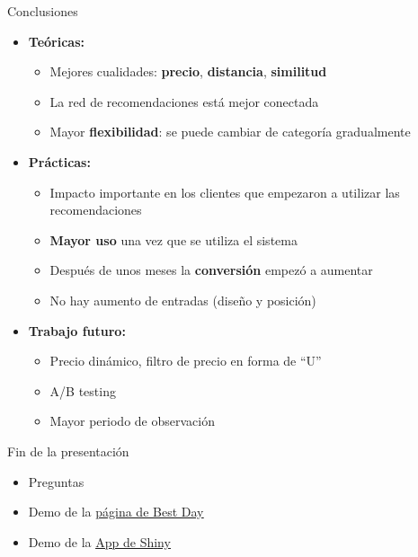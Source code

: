 \documentclass{beamer}
\begin{document}
\begin{frame}{Conclusiones}
	\begin{itemize}
		\item \textbf{Teóricas:}
		\begin{itemize}
			\item Mejores cualidades: \textbf{precio}, \textbf{distancia}, \textbf{similitud}
			\item La red de recomendaciones está mejor conectada
			\item Mayor \textbf{flexibilidad}: se puede cambiar de categoría gradualmente
		\end{itemize}
		\item \textbf{Prácticas:}
		\begin{itemize}
			\item Impacto importante en los clientes que empezaron a utilizar las recomendaciones
			\item \textbf{Mayor uso} una vez que se utiliza el sistema
			\item Después de unos meses la \textbf{conversión} empezó a aumentar
			\item No hay aumento de entradas (diseño y posición)
		\end{itemize}
		\item \textbf{Trabajo futuro:}
		\begin{itemize}
			\item Precio dinámico, filtro de precio en forma de ``U''
			\item A/B testing
			\item Mayor periodo de observación
		\end{itemize}
	\end{itemize}
\end{frame}

\begin{frame}{Fin de la presentación}
\huge
	\begin{itemize}
		\item Preguntas
		\item Demo de la \href{http://www.bestday.com}{\underline{página de Best Day}}
		\item Demo de la \href{https://felipegerard.shinyapps.io/ShinyApp/}{\underline{App de Shiny}}
	\end{itemize}
\end{frame}
\end{document}
